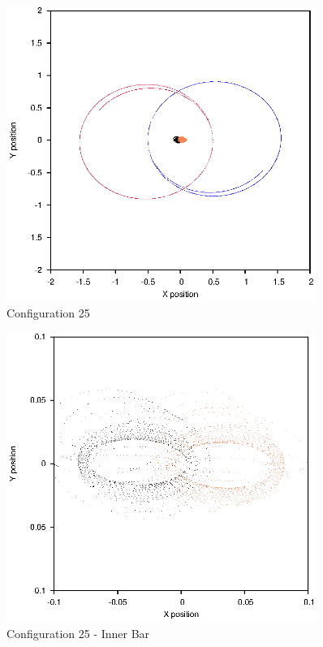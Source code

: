 \documentclass[a4paper,12pt]{article}
\begin{document}
\begin{figure}[H]
\centering
\includegraphics[width=0.9\textwidth]{./2017results/1-1-1-02/Orbit.eps}
\caption{Configuration 25}
\label{fig:config25}
\end{figure}
\begin{figure}[H]
\centering
\includegraphics[width=0.9\textwidth]{./2017results/1-1-1-02/Inner.eps}
\caption{Configuration 25 - Inner Bar}
\label{fig:config25i}
\end{figure}
\end{document}
